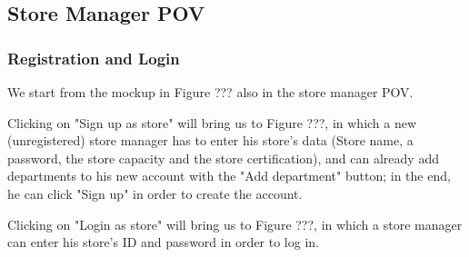 \documentclass{article}
\begin{document}
		
		
	\subsection{Store Manager POV}
		\subsubsection{Registration and Login}
		We start from the mockup in Figure ??? also in the store manager POV.
		
		Clicking on "Sign up as store" will bring us to Figure ???, in which a new (unregistered) store manager has to enter his store's data (Store name, a password, the store capacity and the store certification), and can already add departments to his new account with the "Add department" button; in the end, he can click "Sign up" in order to create the account.
		
		Clicking on "Login as store" will bring us to Figure ???, in which a store manager can enter his store's ID and password in order to log in.
		
\end{document}
